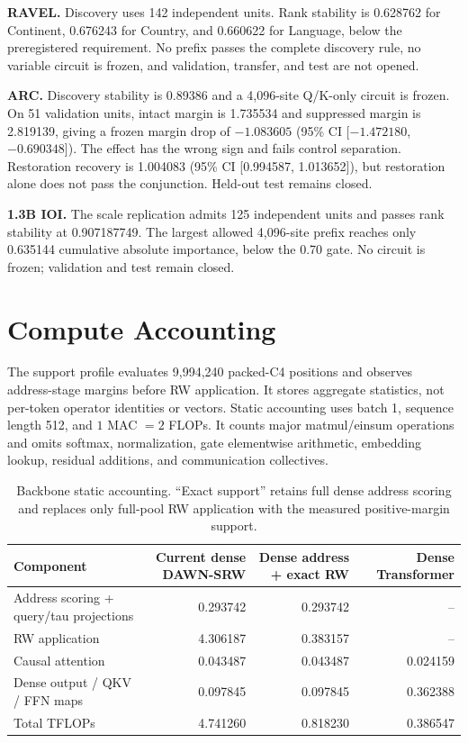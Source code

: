 \documentclass{article}
\newcommand{\DAWN}{DAWN-SRW}
\newcommand{\smallhead}[1]{\vspace{0.25em}\noindent\textbf{#1}}
\begin{document}
\smallhead{RAVEL.}
Discovery uses 142 independent units. Rank stability is 0.628762 for
Continent, 0.676243 for Country, and 0.660622 for Language, below the
preregistered requirement. No prefix passes the complete discovery rule, no
variable circuit is frozen, and validation, transfer, and test are not opened.

\smallhead{ARC.}
Discovery stability is 0.89386 and a 4,096-site Q/K-only circuit is frozen.
On 51 validation units, intact margin is 1.735534 and suppressed margin is
2.819139, giving a frozen margin drop of \(-1.083605\) (95\% CI
[\(-1.472180\), \(-0.690348\)]). The effect has the wrong sign and fails
control separation. Restoration recovery is 1.004083 (95\% CI
[0.994587, 1.013652]), but restoration alone does not pass the conjunction.
Held-out test remains closed.

\smallhead{1.3B IOI.}
The scale replication admits 125 independent units and passes rank stability
at 0.907187749. The largest allowed 4,096-site prefix reaches only 0.635144
cumulative absolute importance, below the 0.70 gate. No circuit is frozen;
validation and test remain closed.

\section{Compute Accounting}
\label{app:compute}

The support profile evaluates 9,994,240 packed-C4 positions and observes
address-stage margins before RW application. It stores aggregate statistics,
not per-token operator identities or vectors. Static accounting uses batch 1,
sequence length 512, and \(1\) MAC \(=2\) FLOPs. It counts major
matmul/einsum operations and omits softmax, normalization, gate elementwise
arithmetic, embedding lookup, residual additions, and communication
collectives.

\begin{table}[!t]
\centering
\caption{Backbone static accounting. ``Exact support'' retains full dense
address scoring and replaces only full-pool RW application with the measured
positive-margin support.}
\scriptsize
\renewcommand{\arraystretch}{0.96}
\begin{tabular}{lrrr}
\toprule
Component & Current dense \DAWN{} & Dense address + exact RW & Dense Transformer\\
\midrule
Address scoring + query/tau projections & 0.293742 & 0.293742 & --\\
RW application & 4.306187 & 0.383157 & --\\
Causal attention & 0.043487 & 0.043487 & 0.024159\\
Dense output / QKV / FFN maps & 0.097845 & 0.097845 & 0.362388\\
\midrule
Total TFLOPs & 4.741260 & 0.818230 & 0.386547\\
\bottomrule
\end{tabular}
\end{table}
\end{document}
